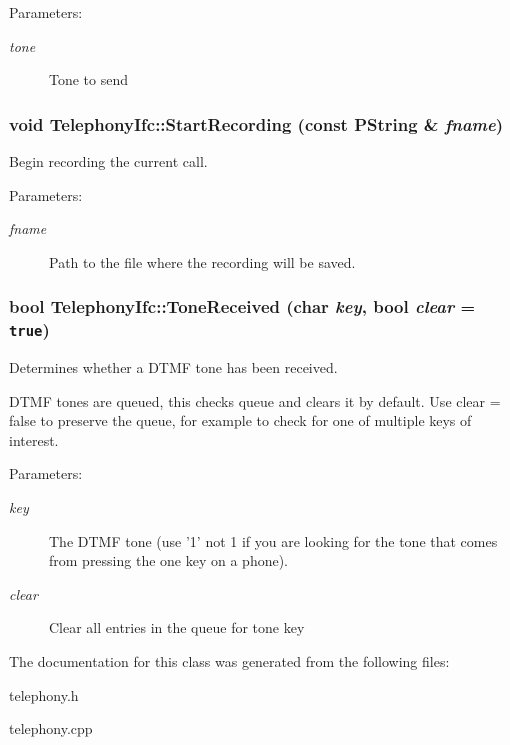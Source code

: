 \begin{Desc}
\item[Parameters:]
\begin{description}
\item[{\em tone}]Tone to send \end{description}
\end{Desc}
\hypertarget{classTelephonyIfc_2cd8176d99232038fbe8718417135b07}{
\subsubsection[{StartRecording}]{\setlength{\rightskip}{0pt plus 5cm}void TelephonyIfc::StartRecording (const PString \& {\em fname})}}
\label{classTelephonyIfc_2cd8176d99232038fbe8718417135b07}


Begin recording the current call. 

\begin{Desc}
\item[Parameters:]
\begin{description}
\item[{\em fname}]Path to the file where the recording will be saved. \end{description}
\end{Desc}
\hypertarget{classTelephonyIfc_60cba0b92e2f33357c063c251fae2997}{
\subsubsection[{ToneReceived}]{\setlength{\rightskip}{0pt plus 5cm}bool TelephonyIfc::ToneReceived (char {\em key}, \/  bool {\em clear} = {\tt true})}}
\label{classTelephonyIfc_60cba0b92e2f33357c063c251fae2997}


Determines whether a DTMF tone has been received. 

DTMF tones are queued, this checks queue and clears it by default. Use clear = false to preserve the queue, for example to check for one of multiple keys of interest.

\begin{Desc}
\item[Parameters:]
\begin{description}
\item[{\em key}]The DTMF tone (use '1' not 1 if you are looking for the tone that comes from pressing the one key on a phone). \item[{\em clear}]Clear all entries in the queue for tone key \end{description}
\end{Desc}


The documentation for this class was generated from the following files:\begin{CompactItemize}
\item 
telephony.h\item 
telephony.cpp\end{CompactItemize}
